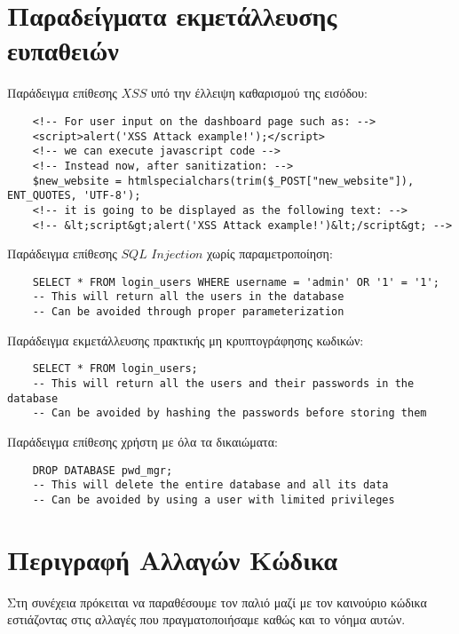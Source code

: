 \documentclass{report}
\begin{document}
\section*{Παραδείγματα εκμετάλλευσης ευπαθειών}
Παράδειγμα επίθεσης $XSS$ υπό την έλλειψη καθαρισμού της εισόδου:
\begin{verbatim}
    <!-- For user input on the dashboard page such as: -->
    <script>alert('XSS Attack example!');</script>
    <!-- we can execute javascript code -->
    <!-- Instead now, after sanitization: -->
    $new_website = htmlspecialchars(trim($_POST["new_website"]), ENT_QUOTES, 'UTF-8');
    <!-- it is going to be displayed as the following text: -->
    <!-- &lt;script&gt;alert('XSS Attack example!')&lt;/script&gt; -->
\end{verbatim}
Παράδειγμα επίθεσης $SQL$ $Injection$ χωρίς παραμετροποίηση:
\begin{verbatim}
    SELECT * FROM login_users WHERE username = 'admin' OR '1' = '1';
    -- This will return all the users in the database
    -- Can be avoided through proper parameterization
\end{verbatim}
Παράδειγμα εκμετάλλευσης πρακτικής μη κρυπτογράφησης κωδικών:
\begin{verbatim}
    SELECT * FROM login_users;
    -- This will return all the users and their passwords in the database
    -- Can be avoided by hashing the passwords before storing them
\end{verbatim}
Παράδειγμα επίθεσης χρήστη με όλα τα δικαιώματα:
\begin{verbatim}
    DROP DATABASE pwd_mgr;
    -- This will delete the entire database and all its data
    -- Can be avoided by using a user with limited privileges
\end{verbatim}
\section*{Περιγραφή Αλλαγών Κώδικα}
Στη συνέχεια πρόκειται να παραθέσουμε τον παλιό μαζί με τον καινούριο κώδικα εστιάζοντας στις 
αλλαγές που πραγματοποιήσαμε καθώς και το νόημα αυτών.
\end{document}
